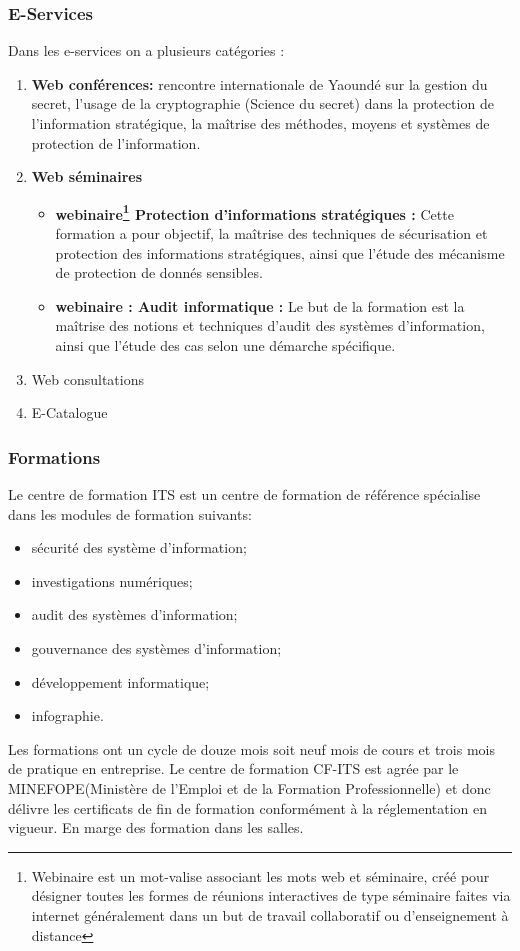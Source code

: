 				\subsubsection{E-Services}
					Dans les e-services on a plusieurs catégories :
					\begin{enumerate}
						\item \textbf{Web conférences:} rencontre internationale de Yaoundé sur la gestion du secret, l'usage de la cryptographie (Science du secret) dans la protection de l'information stratégique, la maîtrise des méthodes, moyens et systèmes de protection de l'information.
						\item \textbf{Web séminaires}
							\begin{itemize}
								\item \textbf{webinaire\footnote{Webinaire est un mot-valise associant les mots web et séminaire, créé pour désigner toutes les formes de réunions interactives de type séminaire faites via internet généralement dans un but de travail collaboratif ou d'enseignement à distance} Protection d'informations stratégiques :} Cette formation a pour objectif, la maîtrise des techniques de sécurisation et protection des informations stratégiques, ainsi que l'étude des mécanisme de protection de donnés sensibles.
								\item \textbf{webinaire : Audit informatique :} Le but de la formation est la maîtrise des notions et techniques d'audit des systèmes d'information, ainsi que l'étude des cas selon une démarche spécifique.
							\end{itemize}
                		\item Web consultations
        				\item E-Catalogue
                
					\end{enumerate}
    
				\subsubsection{Formations}
					Le centre de formation ITS est un centre de formation de référence spécialise dans les modules de formation suivants:
					\begin{itemize}
						\item sécurité des système d'information;
						\item investigations numériques;
						\item audit des systèmes d'information;
						\item gouvernance des systèmes d'information;
						\item développement informatique;
						\item infographie.
					\end{itemize} 
        Les formations ont un cycle de douze mois soit neuf mois de cours et trois mois de pratique en entreprise. Le centre de formation CF-ITS est agrée par le MINEFOPE(Ministère de l'Emploi et de la Formation Professionnelle) et donc délivre les certificats de fin de formation conformément à la réglementation en vigueur. En marge des formation dans les salles. \\
        
